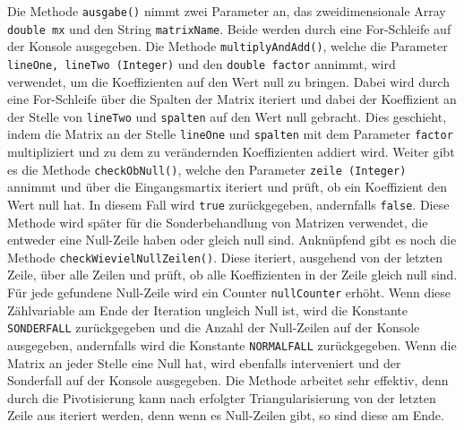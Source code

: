 \documentclass[a4paper, 12pt]{report}
\begin{document}
Die Methode \texttt{ausgabe()} nimmt zwei Parameter an, das zweidimensionale Array \texttt{double mx}
und den String \texttt{matrixName}. Beide werden durch eine For-Schleife auf der Konsole ausgegeben.
Die Methode \texttt{multiplyAndAdd()}, welche die Parameter \texttt{lineOne, lineTwo (Integer)}
und den \texttt{double factor} annimmt, wird verwendet, um die Koeffizienten auf den Wert null zu bringen.
Dabei wird durch eine For-Schleife über die Spalten der Matrix iteriert
und dabei der Koeffizient an der Stelle von \texttt{lineTwo} und \texttt{spalten} auf den Wert null gebracht.
Dies geschieht, indem die Matrix an der Stelle \texttt{lineOne} und \texttt{spalten} mit dem Parameter \texttt{factor} multipliziert
und zu dem zu verändernden Koeffizienten addiert wird.
Weiter gibt es die Methode \texttt{checkObNull()}, welche den Parameter \texttt{zeile (Integer)} annimmt
und über die Eingangsmartix iteriert und prüft, ob ein Koeffizient den Wert null hat. In diesem Fall wird
\texttt{true} zurückgegeben, andernfalls \texttt{false}.
Diese Methode wird später für die Sonderbehandlung von Matrizen verwendet, die entweder eine Null-Zeile haben oder gleich null sind.
Anknüpfend gibt es noch die Methode \texttt{checkWievielNullZeilen()}. Diese iteriert, ausgehend von der letzten Zeile,
über alle Zeilen und prüft, ob alle Koeffizienten in der Zeile gleich null sind. Für jede gefundene Null-Zeile wird ein Counter
\texttt{nullCounter} erhöht. Wenn diese Zählvariable am Ende der Iteration ungleich Null ist, wird die Konstante \texttt{SONDERFALL} zurückgegeben
und die Anzahl der Null-Zeilen auf der Konsole ausgegeben, andernfalls wird die Konstante \texttt{NORMALFALL} zurückgegeben.
Wenn die Matrix an jeder Stelle eine Null hat, wird ebenfalls interveniert und der Sonderfall auf der Konsole ausgegeben.
Die Methode arbeitet sehr effektiv, denn durch die Pivotisierung kann nach erfolgter Triangularisierung von der letzten Zeile aus iteriert werden, denn
wenn es Null-Zeilen gibt, so sind diese am Ende.
\end{document}
